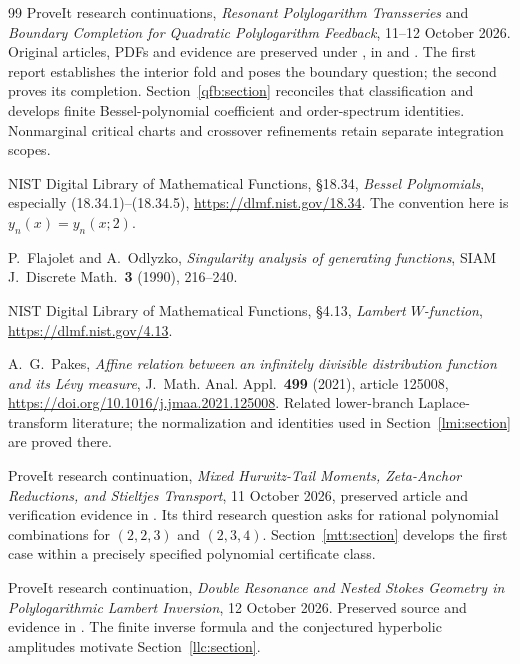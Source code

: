 \begin{thebibliography}{99}
ProveIt research continuations, \emph{Resonant Polylogarithm Transseries}
and \emph{Boundary Completion for Quadratic Polylogarithm Feedback},
11--12 October 2026. Original articles, PDFs and evidence are preserved
under , in
 and
.
The first report establishes the interior fold and poses the boundary
question; the second proves its completion. Section~\ref{qfb:section}
reconciles that classification and develops finite Bessel-polynomial
coefficient and order-spectrum identities. Nonmarginal critical charts and
crossover refinements retain separate integration scopes.

NIST Digital Library of Mathematical Functions, \S18.34,
\emph{Bessel Polynomials}, especially (18.34.1)--(18.34.5),
\url{https://dlmf.nist.gov/18.34}. The convention here is
$y_n(x)=y_n(x;2)$.

P.~Flajolet and A.~Odlyzko, \emph{Singularity analysis of generating
functions}, SIAM J.~Discrete Math.~\textbf{3} (1990), 216--240.

NIST Digital Library of Mathematical Functions, \S4.13,
\emph{Lambert $W$-function}, \url{https://dlmf.nist.gov/4.13}.

A.~G.~Pakes, \emph{Affine relation between an infinitely divisible
distribution function and its L\'evy measure}, J.~Math. Anal. Appl.\
\textbf{499} (2021), article 125008,
\url{https://doi.org/10.1016/j.jmaa.2021.125008}.
Related lower-branch Laplace-transform literature; the normalization
and identities used in Section~\ref{lmi:section} are proved there.

ProveIt research continuation, \emph{Mixed Hurwitz-Tail Moments,
Zeta-Anchor Reductions, and Stieltjes Transport}, 11 October 2026,
preserved article and verification evidence in
.
Its third research question asks for rational polynomial combinations
for $(2,2,3)$ and $(2,3,4)$. Section~\ref{mtt:section} develops the first
case within a precisely specified polynomial certificate class.

ProveIt research continuation, \emph{Double Resonance and Nested Stokes
Geometry in Polylogarithmic Lambert Inversion}, 12 October 2026.
Preserved source and evidence in
.
The finite inverse formula and the conjectured hyperbolic amplitudes
motivate Section~\ref{llc:section}.


\end{thebibliography}
